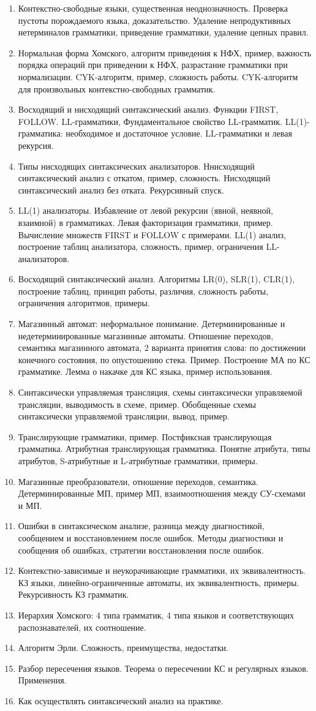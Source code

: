 \documentclass[12pt]{article}
\newcommand{\litem}[1]{\item #1 }%
\begin{document}
\begin{enumerate}
  \litem {Контекстно-свободные языки, существенная неоднозначность. Проверка пустоты порождаемого языка, доказательство. Удаление непродуктивных нетерминалов грамматики, приведение грамматики, удаление цепных правил. }
  \litem {Нормальная форма Хомского, алгоритм приведения к НФХ, пример, важность порядка операций при приведении к НФХ, разрастание грамматики при нормализации. CYK-алгоритм, пример, сложность работы. CYK-алгоритм для произвольных контекстно-свободных грамматик. }
  \litem {Восходящий и нисходящий синтаксический анализ. Функции FIRST, FOLLOW. LL-грамматики, Фундаментальное свойство LL-грамматик. LL(1)-грамматика: необходимое и достаточное условие. LL-грамматики и левая рекурсия.}
  \litem {Типы нисходящих синтаксических анализаторов. Ннисходящий синтаксический анализ с откатом, пример, сложность. Нисходящий синтаксический анализ без отката. Рекурсивный спуск. }
  \litem {LL(1) анализаторы. Избавление от левой рекурсии (явной, неявной, взаимной) в грамматиках. Левая факторизация грамматики, пример. Вычисление множеств FIRST и FOLLOW с примерами. LL(1) анализ, построение таблиц анализатора, сложность, пример, ограничения LL-анализаторов. }
  \litem {Восходящий синтаксический анализ. Алгоритмы LR(0), SLR(1), CLR(1), построение таблиц, принцип работы, различия, сложность работы, ограничения алгоритмов, примеры.}
  \litem {Магазинный автомат: неформальное понимание. Детерминированные и недетерминированные магазинные автоматы. Отношение переходов, семантика магазинного автомата, 2 варианта принятия слова: по достижении конечного состояния, по опустошению стека. Пример. Построение МА по КС грамматике. Лемма о накачке для КС языка, пример использования. }
  \litem {Синтаксически управляемая трансляция, схемы синтаксически управляемой трансляции, выводимость в схеме, пример. Обобщенные схемы синтаксически управляемой трансляции, вывод, пример. }
  \litem {Транслирующие грамматики, пример. Постфиксная транслирующая грамматика. Атрибутная транслирующая грамматика. Понятие атрибута, типы атрибутов, S-атрибутные и L-атрибутные грамматики, примеры. }
  \litem {Магазинные преобразователи, отношение переходов, семантика. Детерминированные МП, пример МП, взаимоотношения между СУ-схемами и МП.}
  \litem {Ошибки в синтаксическом анализе, разница между диагностикой, сообщением и восстановлением после ошибок. Методы диагностики и сообщения об ошибках, стратегии восстановления после ошибок. }
  \litem {Контекстно-зависимые и неукорачивающие грамматики, их эквивалентность. КЗ языки, линейно-ограниченные автоматы, их эквивалентность, примеры. Рекурсивность КЗ грамматик. }
  \litem {Иерархия Хомского: 4 типа грамматик, 4 типа языков и соответствующих распознавателей, их соотношение.}
  \litem {Алгоритм Эрли. Сложность, преимущества, недостатки. }
  \litem {Разбор пересечения языков. Теорема о пересечении КС и регулярных языков. Применения.}
  \litem {Как осуществлять синтаксический анализ на практике.  }
\end{enumerate}
\end{document}
